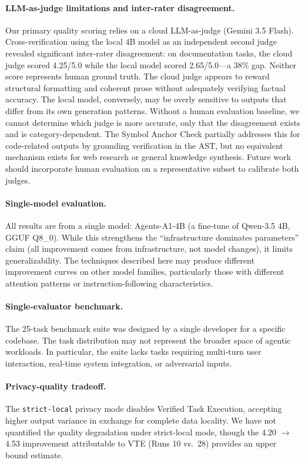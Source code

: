 \documentclass{article}
\begin{document}
\paragraph{LLM-as-judge limitations and inter-rater disagreement.}
Our primary quality scoring relies on a cloud LLM-as-judge (Gemini 3.5 Flash).
Cross-verification using the local 4B model as an independent second judge revealed significant inter-rater disagreement: on documentation tasks, the cloud judge scored 4.25/5.0 while the local model scored 2.65/5.0---a 38\% gap.
Neither score represents human ground truth.
The cloud judge appears to reward structural formatting and coherent prose without adequately verifying factual accuracy.
The local model, conversely, may be overly sensitive to outputs that differ from its own generation patterns.
Without a human evaluation baseline, we cannot determine which judge is more accurate, only that the disagreement exists and is category-dependent.
The Symbol Anchor Check partially addresses this for code-related outputs by grounding verification in the AST, but no equivalent mechanism exists for web research or general knowledge synthesis.
Future work should incorporate human evaluation on a representative subset to calibrate both judges.

\paragraph{Single-model evaluation.}
All results are from a single model: Agents-A1-4B (a fine-tune of Qwen-3.5 4B, GGUF Q8\_0).
While this strengthens the ``infrastructure dominates parameters'' claim (all improvement comes from infrastructure, not model changes), it limits generalizability.
The techniques described here may produce different improvement curves on other model families, particularly those with different attention patterns or instruction-following characteristics.

\paragraph{Single-evaluator benchmark.}
The 25-task benchmark suite was designed by a single developer for a specific codebase.
The task distribution may not represent the broader space of agentic workloads.
In particular, the suite lacks tasks requiring multi-turn user interaction, real-time system integration, or adversarial inputs.

\paragraph{Privacy-quality tradeoff.}
The \texttt{strict-local} privacy mode disables Verified Task Execution, accepting higher output variance in exchange for complete data locality.
We have not quantified the quality degradation under strict-local mode, though the 4.20 $\to$ 4.53 improvement attributable to VTE (Runs 10 vs.\ 28) provides an upper bound estimate.
\end{document}
